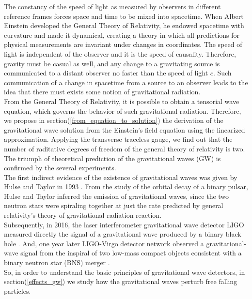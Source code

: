 The constancy of the speed of light as measured by observers in different reference frames forces space and time to be mixed into spacetime.
When Albert Einstein developed the General Theory of Relativity, he endowed spacetime with curvature and made it dynamical, creating a theory in which all predictions for physical measurements are invariant under changes in coordinates.
The speed of light is independent of the observer and it is the speed of causality.
Therefore, gravity must be casual as well, and
any change to a gravitating source is communicated to a distant observer no faster than the speed of light $c$.
Such communication of a change in spacetime from a source to an observer leads to the idea that there must exists some notion of gravitational radiation.\\
From the General Theory of Relativity, it is possible to obtain a tensorial wave equation, which governs the behavior of such gravitational radiation.
Therefore, we propose in  section(\ref{from_equation_to_solution}) the derivation of the gravitational wave solution from the Einstein's field equation using the linearized approximation.
Applying the transverse traceless gauge, we find out that the number of raditative degrees of freedom of the general theory of relativity is two.\\
The triumph of theoretical prediction of the gravitational waves (GW) is confirmed by the several experiments.\\
The first indirect evidence of the existence of gravitational waves was given by Hulse and Taylor in 1993 \cite{weisberg_relativistic_2004,weisberg_timing_2010}. 
From the study of the orbital decay of a binary pulsar, Hulse and Taylor inferred the emission of gravitational waves, since the two neutron stars were spiraling together at just the rate predicted by general relativity’s theory of gravitational radiation reaction.\\
Subsequently, in 2016, the laser interferometer gravitational wave detector LIGO measured directly the signal of a gravitational wave produced by a binary black hole \cite{abbott_observation_2016}.
And, one year later LIGO-Virgo detector network observed a gravitational-wave signal from the inspiral of two low-mass compact objects consistent with a binary neutron star (BNS) merger \cite{abbott_gw170817:_2017}.\\
So, in order to understand the basic principles of gravitational wave detectors, in section(\ref{effects_gw}) we study how the gravitational waves perturb free falling particles.\\
